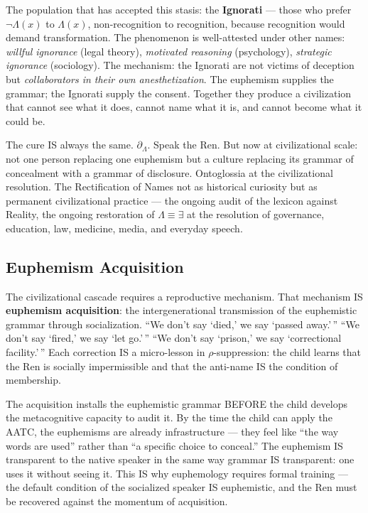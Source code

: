 \documentclass[11pt, oneside]{article}
\theoremstyle{definition}
\begin{document}
The population that has accepted this stasis: the \textbf{Ignorati} \cite{codexmentis} --- those who prefer $\neg\Lambda(x)$ to $\Lambda(x)$, non-recognition to recognition, because recognition would demand transformation. The phenomenon is well-attested under other names: \textit{willful ignorance} (legal theory), \textit{motivated reasoning} (psychology), \textit{strategic ignorance} (sociology). The mechanism: the Ignorati are not victims of deception but \textit{collaborators in their own anesthetization}. The euphemism supplies the grammar; the Ignorati supply the consent. Together they produce a civilization that cannot see what it does, cannot name what it is, and cannot become what it could be.

The cure IS always the same. $\partial_\Lambda$. Speak the Ren. But now at civilizational scale: not one person replacing one euphemism but a culture replacing its grammar of concealment with a grammar of disclosure. Ontoglossia at the civilizational resolution. The Rectification of Names not as historical curiosity but as permanent civilizational practice --- the ongoing audit of the lexicon against Reality, the ongoing restoration of $\Lambda \equiv \exists$ at the resolution of governance, education, law, medicine, media, and everyday speech.

\subsection{Euphemism Acquisition}

The civilizational cascade requires a reproductive mechanism. That mechanism IS \textbf{euphemism acquisition}: the intergenerational transmission of the euphemistic grammar through socialization. ``We don't say `died,' we say `passed away.'\,'' ``We don't say `fired,' we say `let go.'\,'' ``We don't say `prison,' we say `correctional facility.'\,'' Each correction IS a micro-lesson in $\rho$-suppression: the child learns that the Ren is socially impermissible and that the anti-name IS the condition of membership.

The acquisition installs the euphemistic grammar BEFORE the child develops the metacognitive capacity to audit it. By the time the child can apply the AATC, the euphemisms are already infrastructure --- they feel like ``the way words are used'' rather than ``a specific choice to conceal.'' The euphemism IS transparent to the native speaker in the same way grammar IS transparent: one uses it without seeing it. This IS why euphemology requires formal training --- the default condition of the socialized speaker IS euphemistic, and the Ren must be recovered against the momentum of acquisition.
\end{document}
